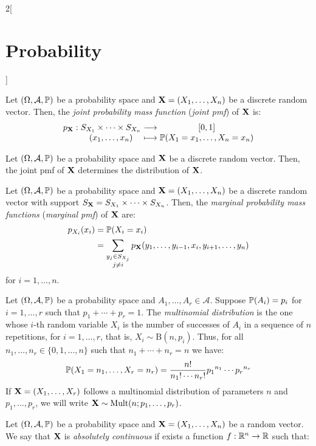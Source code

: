 \documentclass[../../../main_math.tex]{subfiles}
\begin{document}
\begin{multicols}{2}[\section{Probability}]
\begin{proposition}
  \end{proposition}
  \begin{definition}
    Let $(\Omega,\mathcal{A},\mathbb{P})$ be a probability space and $\boldsymbol{\mathrm{X}}=(X_1,\ldots,X_n)$ be a discrete random vector. Then, the \emph{joint probability mass function} (\emph{joint pmf}) of $\boldsymbol{\mathrm{X}}$ is:
    $$
      \function{p_{\vf{X}}}{S_{X_1}\times\cdots\times S_{X_n}}{[0,1]}{(x_1,\ldots,x_n)}{\Prob(X_1=x_1,\ldots,X_n=x_n)}
    $$
  \end{definition}
  \begin{proposition}
    Let $(\Omega,\mathcal{A},\mathbb{P})$ be a probability space and $\boldsymbol{\mathrm{X}}$ be a discrete random vector. Then, the joint pmf of $\boldsymbol{\mathrm{X}}$ determines the distribution of $\boldsymbol{\mathrm{X}}$.
  \end{proposition}
  \begin{definition}
    Let $(\Omega,\mathcal{A},\mathbb{P})$ be a probability space and $\boldsymbol{\mathrm{X}}=(X_1,\ldots,X_n)$ be a discrete random vector with support $S_{\boldsymbol{\mathrm{X}}}=S_{X_1}\times\cdots\times S_{X_n}$. Then, the \emph{marginal probability mass functions} (\emph{marginal pmf}) of $\boldsymbol{\mathrm{X}}$ are:
    \begin{align*}
      p_{X_i}(x_i) & =\mathbb{P}(X_i=x_i)                 \\
                   & =\sum_{\substack{y_j\in S_{X_j} \\j\ne i}}p_{\boldsymbol{\mathrm{X}}}(y_1,\ldots,y_{i-1},x_i,y_{i+1},\ldots,y_n)
    \end{align*}
    for $i=1,\ldots,n$.
  \end{definition}
  \begin{definition}
    Let $(\Omega,\mathcal{A},\mathbb{P})$ be a probability space and $A_1,\ldots,A_r\in\mathcal{A}$. Suppose $\mathbb{P}(A_i)=p_i$ for $i=1,\ldots,r$ such that $p_1+\cdots+p_r=1$. The \emph{multinomial distribution} is the one whose $i$-th random variable $X_i$ is the number of successes of $A_i$ in a sequence of $n$ repetitions, for $i=1,\ldots,r$, that is, $X_i\sim\text{B}(n,p_i)$. Thus, for all $n_1,\ldots,n_r\in\{0,1,\ldots,n\}$ such that $n_1+\cdots+n_r=n$ we have: $$\mathbb{P}(X_1=n_1,\ldots,X_r=n_r)=\frac{n!}{n_1!\cdots n_r!} {p_1}^{n_1}\cdots{p_r}^{n_r}$$ If $\boldsymbol{\mathrm{X}}=(X_1,\ldots,X_r)$ follows a multinomial distribution of parameters $n$ and $p_1,\ldots,p_r$, we will write $\boldsymbol{\mathrm{X}}\sim \text{Mult}(n;p_1,\ldots,p_r)$.
  \end{definition}
  \begin{definition}
    Let $(\Omega,\mathcal{A},\mathbb{P})$ be a probability space and $\boldsymbol{\mathrm{X}}=(X_1,\ldots,X_n)$ be a random vector. We say that $\boldsymbol{\mathrm{X}}$ is \emph{absolutely continuous} if exists a function $f:\mathbb{R}^n\rightarrow\mathbb{R}$ such that:

\end{definition}
\end{multicols}
\end{document}
